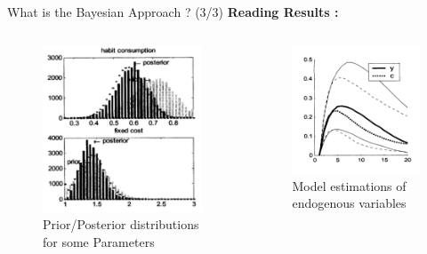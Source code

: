 \documentclass{beamer}
\begin{document}
\begin{frame}{What is the Bayesian Approach ? (3/3)}
\textbf{Reading Results :}
\begin{columns}
		\begin{figure}
			\centering
			\includegraphics[width=.8\textwidth]{images/Estimation Parameters.png}
			\caption{Prior/Posterior distributions for some Parameters}
		\end{figure}	
		\begin{figure}
			\centering
			\includegraphics[width=.8\textwidth]{images/Estimation Variables.png}
			\caption{Model estimations of endogenous variables}
		\end{figure}
\end{columns}
\end{frame}
\end{document}
